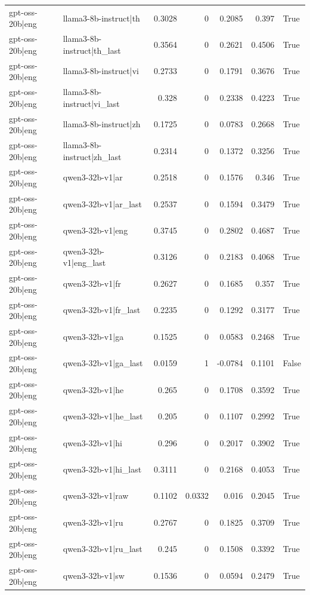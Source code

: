 \begin{table}
\begin{tabular}{l l r r r r l}
gpt-oss-20b|eng & llama3-8b-instruct|th & 0.3028 & 0 & 0.2085 & 0.397 & True \\
gpt-oss-20b|eng & llama3-8b-instruct|th_last & 0.3564 & 0 & 0.2621 & 0.4506 & True \\
gpt-oss-20b|eng & llama3-8b-instruct|vi & 0.2733 & 0 & 0.1791 & 0.3676 & True \\
gpt-oss-20b|eng & llama3-8b-instruct|vi_last & 0.328 & 0 & 0.2338 & 0.4223 & True \\
gpt-oss-20b|eng & llama3-8b-instruct|zh & 0.1725 & 0 & 0.0783 & 0.2668 & True \\
gpt-oss-20b|eng & llama3-8b-instruct|zh_last & 0.2314 & 0 & 0.1372 & 0.3256 & True \\
gpt-oss-20b|eng & qwen3-32b-v1|ar & 0.2518 & 0 & 0.1576 & 0.346 & True \\
gpt-oss-20b|eng & qwen3-32b-v1|ar_last & 0.2537 & 0 & 0.1594 & 0.3479 & True \\
gpt-oss-20b|eng & qwen3-32b-v1|eng & 0.3745 & 0 & 0.2802 & 0.4687 & True \\
gpt-oss-20b|eng & qwen3-32b-v1|eng_last & 0.3126 & 0 & 0.2183 & 0.4068 & True \\
gpt-oss-20b|eng & qwen3-32b-v1|fr & 0.2627 & 0 & 0.1685 & 0.357 & True \\
gpt-oss-20b|eng & qwen3-32b-v1|fr_last & 0.2235 & 0 & 0.1292 & 0.3177 & True \\
gpt-oss-20b|eng & qwen3-32b-v1|ga & 0.1525 & 0 & 0.0583 & 0.2468 & True \\
gpt-oss-20b|eng & qwen3-32b-v1|ga_last & 0.0159 & 1 & -0.0784 & 0.1101 & False \\
gpt-oss-20b|eng & qwen3-32b-v1|he & 0.265 & 0 & 0.1708 & 0.3592 & True \\
gpt-oss-20b|eng & qwen3-32b-v1|he_last & 0.205 & 0 & 0.1107 & 0.2992 & True \\
gpt-oss-20b|eng & qwen3-32b-v1|hi & 0.296 & 0 & 0.2017 & 0.3902 & True \\
gpt-oss-20b|eng & qwen3-32b-v1|hi_last & 0.3111 & 0 & 0.2168 & 0.4053 & True \\
gpt-oss-20b|eng & qwen3-32b-v1|raw & 0.1102 & 0.0332 & 0.016 & 0.2045 & True \\
gpt-oss-20b|eng & qwen3-32b-v1|ru & 0.2767 & 0 & 0.1825 & 0.3709 & True \\
gpt-oss-20b|eng & qwen3-32b-v1|ru_last & 0.245 & 0 & 0.1508 & 0.3392 & True \\
gpt-oss-20b|eng & qwen3-32b-v1|sw & 0.1536 & 0 & 0.0594 & 0.2479 & True \\

\end{tabular}
\end{table}
